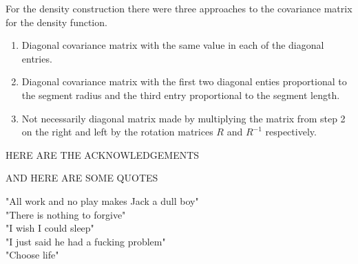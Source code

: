 \documentclass[11pt,a4paper]{article}
\numberwithin{equation}{section}
\theoremstyle{plain}
\theoremstyle{definition}
\theoremstyle{remark}
\begin{document}
For the density construction there were three approaches to the covariance matrix for the density function.

\begin{enumerate}
	\item Diagonal covariance matrix with the same value in each of the diagonal entries.
	\item Diagonal covariance matrix with the first two diagonal enties proportional to the segment radius and the third entry proportional to the segment length.
	\item Not necessarily diagonal matrix made by multiplying the matrix from step 2 on the right and left by the rotation matrices $R$ and $R^{-1}$ respectively.  
\end{enumerate}	


HERE ARE THE ACKNOWLEDGEMENTS

AND HERE ARE SOME QUOTES

"All work and no play makes Jack a dull boy"\\
"There is nothing to forgive"\\
"I wish I could sleep"\\
"I just said he had a fucking problem"\\
"Choose life"

	

    
\end{document}

